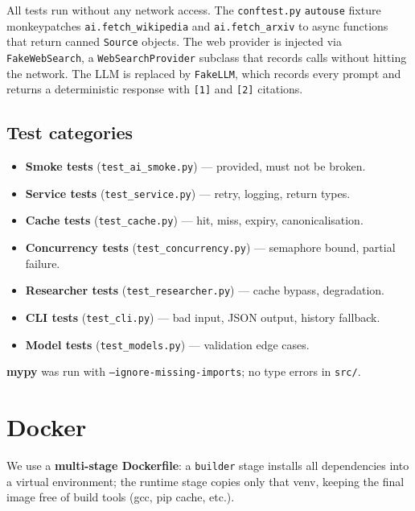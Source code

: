 \documentclass[12pt,a4paper]{article}
\begin{document}
All tests run without any network access. The \texttt{conftest.py} \texttt{autouse} fixture
monkeypatches \texttt{ai.fetch\_wikipedia} and \texttt{ai.fetch\_arxiv} to async functions
that return canned \texttt{Source} objects. The web provider is injected via
\texttt{FakeWebSearch}, a \texttt{WebSearchProvider} subclass that records calls without
hitting the network. The LLM is replaced by \texttt{FakeLLM}, which records every prompt
and returns a deterministic response with \texttt{[1]} and \texttt{[2]} citations.

\subsection{Test categories}

\begin{itemize}
  \item \textbf{Smoke tests} (\texttt{test\_ai\_smoke.py}) — provided, must not be broken.
  \item \textbf{Service tests} (\texttt{test\_service.py}) — retry, logging, return types.
  \item \textbf{Cache tests} (\texttt{test\_cache.py}) — hit, miss, expiry, canonicalisation.
  \item \textbf{Concurrency tests} (\texttt{test\_concurrency.py}) — semaphore bound, partial failure.
  \item \textbf{Researcher tests} (\texttt{test\_researcher.py}) — cache bypass, degradation.
  \item \textbf{CLI tests} (\texttt{test\_cli.py}) — bad input, JSON output, history fallback.
  \item \textbf{Model tests} (\texttt{test\_models.py}) — validation edge cases.
\end{itemize}

\textbf{mypy} was run with \texttt{--ignore-missing-imports}; no type errors in \texttt{src/}.

\section{Docker}

We use a \textbf{multi-stage Dockerfile}: a \texttt{builder} stage installs all dependencies
into a virtual environment; the runtime stage copies only that venv, keeping the final image
free of build tools (gcc, pip cache, etc.).
\end{document}
